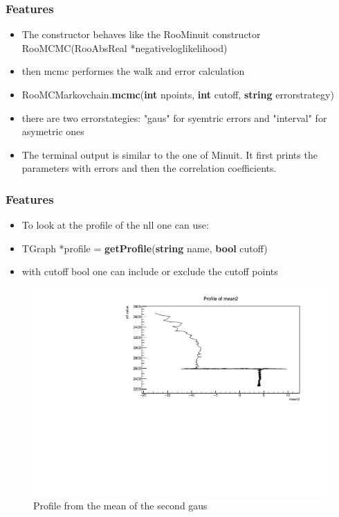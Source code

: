 \documentclass{beamer}
\begin{document}
\begin{frame}
 \frametitle{Features}
 \begin{itemize}
  \item The constructor behaves like the RooMinuit constructor RooMCMC(RooAbsReal *negativeloglikelihood)
  \item then mcmc performes the walk and error calculation
  \item RooMCMarkovchain.\textbf{mcmc}(\textbf{int} npoints, \textbf{int} cutoff, \textbf{string} errorstrategy)
  \item there are two errorstategies: "gaus" for syemtric errors and "interval" for asymetric ones
  \item The terminal output is similar to the one of Minuit. It first prints the parameters with errors and then the correlation coefficients.
 \end{itemize}
\end{frame}

\begin{frame}
 \frametitle{Features}
 \begin{itemize}
  \item To look at the profile of the nll one can use:
  \item TGraph *profile = \textbf{getProfile}(\textbf{string} name, \textbf{bool} cutoff)
  \item with cutoff bool one can include or exclude the cutoff points
 \end{itemize}

 \begin{figure}
  \includegraphics[width=0.8\linewidth]{figures/profile_mean2}
  \caption{Profile from the mean of the second gaus}
 \end{figure}

\end{frame}
\end{document}

